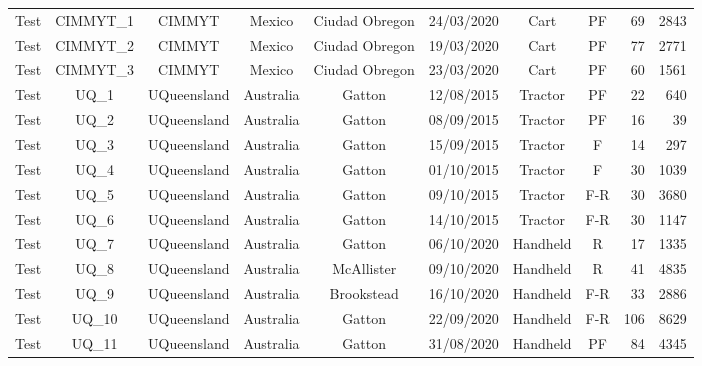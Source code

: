 \begin{table}[h]
{\begin{small}
\begin{tabular}{lcccccccrr}
Test & CIMMYT\_1 & CIMMYT & Mexico & Ciudad Obregon & 24/03/2020 & Cart & PF & 69 & 2843 \\
Test & CIMMYT\_2 & CIMMYT & Mexico & Ciudad Obregon & 19/03/2020 & Cart & PF & 77 & 2771 \\
Test & CIMMYT\_3 & CIMMYT & Mexico & Ciudad Obregon & 23/03/2020 & Cart & PF & 60 & 1561 \\
Test & UQ\_1 & UQueensland & Australia & Gatton & 12/08/2015 & Tractor & PF & 22 & 640 \\
Test & UQ\_2 & UQueensland & Australia & Gatton & 08/09/2015 & Tractor & PF & 16 & 39 \\
Test & UQ\_3 & UQueensland & Australia & Gatton & 15/09/2015 & Tractor & F & 14 & 297 \\
Test & UQ\_4 & UQueensland & Australia & Gatton & 01/10/2015 & Tractor & F & 30 & 1039 \\
Test & UQ\_5 & UQueensland & Australia & Gatton & 09/10/2015 & Tractor & F-R & 30 & 3680 \\
Test & UQ\_6 & UQueensland & Australia & Gatton & 14/10/2015 & Tractor & F-R & 30 & 1147 \\
Test & UQ\_7 & UQueensland & Australia & Gatton & 06/10/2020 & Handheld & R & 17 & 1335 \\
Test & UQ\_8 & UQueensland & Australia & McAllister & 09/10/2020 & Handheld & R & 41 & 4835 \\
Test & UQ\_9 & UQueensland & Australia & Brookstead & 16/10/2020 & Handheld & F-R & 33 & 2886 \\
Test & UQ\_10 & UQueensland & Australia & Gatton & 22/09/2020 & Handheld & F-R & 106 & 8629 \\
Test & UQ\_11 & UQueensland & Australia & Gatton & 31/08/2020 & Handheld & PF & 84 & 4345 \\
  \bottomrule
  \end{tabular}
\end{small}  }
  \label{tab:app_dataset_detail_wheat}
\end{table}

